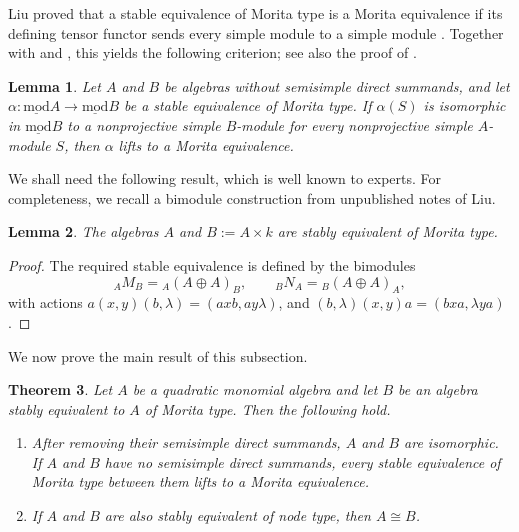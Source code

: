 \documentclass[11pt]{article}
\newcommand{\smod}{\operatorname{\underline{mod}}}
\newtheorem{theorem}{Theorem}[section]
\newtheorem{lemma}[theorem]{Lemma}
\theoremstyle{definition}
\begin{document}

		Liu proved that a stable equivalence of Morita type is a Morita equivalence if its defining tensor functor sends every simple module to a simple module \cite[Theorem~1.1]{Liu03}. Together with \cite[Lemma~3.1]{Liu06} and \cite[Lemma~4.4]{KL12}, this yields the following criterion; see also the proof of \cite[Proposition~4.3]{KL12}.

		\begin{lemma}
			\label{lemma of simple preserving Morita type}
			Let $A$ and $B$ be algebras without semisimple direct summands, and let $\alpha:\smod A\longrightarrow\smod B$ be a stable equivalence of Morita type.
			If $\alpha(S)$ is isomorphic in $\smod B$ to a nonprojective simple $B$-module for every nonprojective simple $A$-module $S$, then $\alpha$ lifts to a Morita equivalence.
		\end{lemma}

		We shall need the following result, which is well known to experts. For completeness, we recall a bimodule construction from unpublished notes of Liu.

		\begin{lemma}\label{lemma of adjoining semisimple factors}
			The algebras $A$ and $B:=A\times k$ are stably equivalent of Morita type.
		\end{lemma}

		\begin{proof}
			The required stable equivalence is defined by the bimodules
			\[
				{}_AM_B={}_A(A\oplus A)_B,
				\qquad
				{}_BN_A={}_B(A\oplus A)_A,
			\]
			with actions $a(x,y)(b,\lambda)=(axb,ay\lambda)$, and $(b,\lambda)(x,y)a=(bxa,\lambda ya)$.
		\end{proof}


		We now prove the main result of this subsection.

		\begin{theorem}\label{corollary of AG Morita rigidity}
			Let $A$ be a quadratic monomial algebra and let $B$ be an algebra stably equivalent to $A$ of Morita type. Then the following hold.
			\begin{enumerate}
				\item After removing their semisimple direct summands, $A$ and $B$ are isomorphic.
				If $A$ and $B$ have no semisimple direct summands, every stable equivalence of Morita type between them lifts to a Morita equivalence. 

				\item If $A$ and $B$ are also stably equivalent of node type, then $A\cong B$.
			\end{enumerate}
		\end{theorem}
\end{document}
